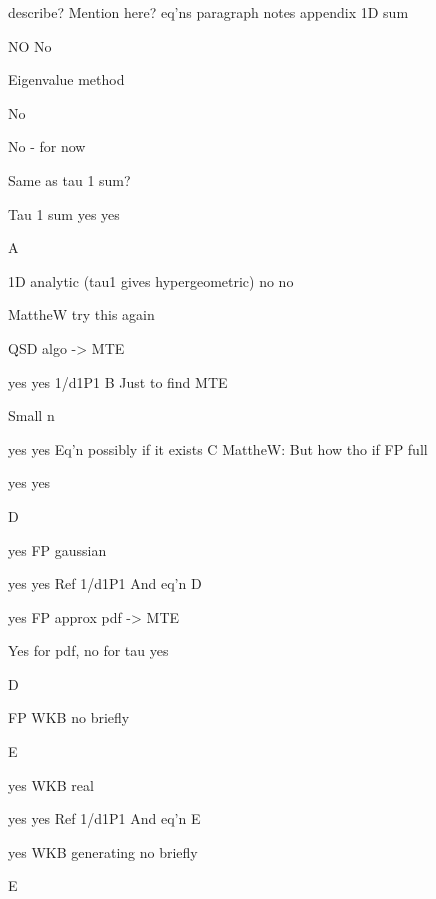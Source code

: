 \documentclass[a4paper,10pt]{article}
\numberwithin{equation}{section} %
\begin{document}
describe?
Mention here?
eq’ns
paragraph
notes
appendix
1D sum


NO
No








Eigenvalue method


No


No - for now




Same as tau 1 sum?


Tau 1 sum
yes
yes


A




1D analytic
(tau1 gives hypergeometric)
no
no




MattheW try this again


QSD algo -> MTE


yes
yes
1/d1P1
B
Just to find MTE


Small n


yes
yes
Eq’n possibly if it exists
C
MattheW: But how tho
if
FP full


yes
yes


D


yes
FP gaussian


yes
yes
Ref 1/d1P1
And eq’n
D


yes
FP approx pdf -> MTE


Yes for pdf, no for tau
yes


D




FP WKB
no
briefly


E


yes
WKB real


yes
yes
Ref 1/d1P1
And eq’n
E


yes
WKB generating
no
briefly


E
\end{document}

